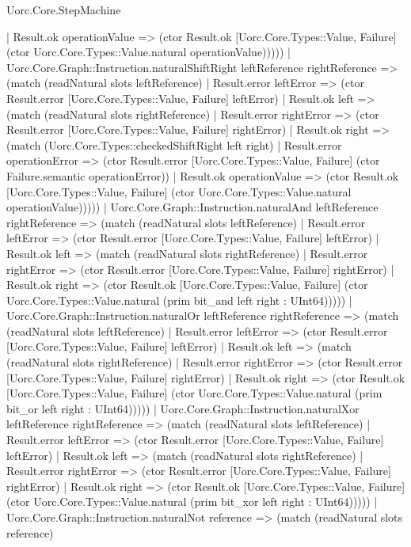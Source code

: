 \begin{lexlean}{Uorc.Core.StepMachine}
\begin{semanticmodule}
{          | Result.ok operationValue => (ctor Result.ok [Uorc.Core.Types::Value, Failure] (ctor Uorc.Core.Types::Value.natural operationValue)))))
    | Uorc.Core.Graph::Instruction.naturalShiftRight leftReference rightReference => (match (readNatural slots leftReference)
      | Result.error leftError => (ctor Result.error [Uorc.Core.Types::Value, Failure] leftError)
      | Result.ok left => (match (readNatural slots rightReference)
        | Result.error rightError => (ctor Result.error [Uorc.Core.Types::Value, Failure] rightError)
        | Result.ok right => (match (Uorc.Core.Types::checkedShiftRight left right)
          | Result.error operationError => (ctor Result.error [Uorc.Core.Types::Value, Failure] (ctor Failure.semantic operationError))
          | Result.ok operationValue => (ctor Result.ok [Uorc.Core.Types::Value, Failure] (ctor Uorc.Core.Types::Value.natural operationValue)))))
    | Uorc.Core.Graph::Instruction.naturalAnd leftReference rightReference => (match (readNatural slots leftReference)
      | Result.error leftError => (ctor Result.error [Uorc.Core.Types::Value, Failure] leftError)
      | Result.ok left => (match (readNatural slots rightReference)
        | Result.error rightError => (ctor Result.error [Uorc.Core.Types::Value, Failure] rightError)
        | Result.ok right => (ctor Result.ok [Uorc.Core.Types::Value, Failure] (ctor Uorc.Core.Types::Value.natural (prim bit_and left right : UInt64)))))
    | Uorc.Core.Graph::Instruction.naturalOr leftReference rightReference => (match (readNatural slots leftReference)
      | Result.error leftError => (ctor Result.error [Uorc.Core.Types::Value, Failure] leftError)
      | Result.ok left => (match (readNatural slots rightReference)
        | Result.error rightError => (ctor Result.error [Uorc.Core.Types::Value, Failure] rightError)
        | Result.ok right => (ctor Result.ok [Uorc.Core.Types::Value, Failure] (ctor Uorc.Core.Types::Value.natural (prim bit_or left right : UInt64)))))
    | Uorc.Core.Graph::Instruction.naturalXor leftReference rightReference => (match (readNatural slots leftReference)
      | Result.error leftError => (ctor Result.error [Uorc.Core.Types::Value, Failure] leftError)
      | Result.ok left => (match (readNatural slots rightReference)
        | Result.error rightError => (ctor Result.error [Uorc.Core.Types::Value, Failure] rightError)
        | Result.ok right => (ctor Result.ok [Uorc.Core.Types::Value, Failure] (ctor Uorc.Core.Types::Value.natural (prim bit_xor left right : UInt64)))))
    | Uorc.Core.Graph::Instruction.naturalNot reference => (match (readNatural slots reference)
}
\end{semanticmodule}
\end{lexlean}
